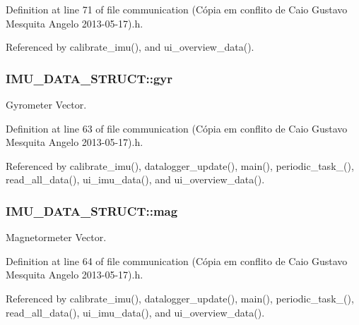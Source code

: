 Definition at line 71 of file communication (\-Cópia em conflito de Caio Gustavo Mesquita Angelo 2013-\/05-\/17).\-h.



Referenced by calibrate\-\_\-imu(), and ui\-\_\-overview\-\_\-data().

\hypertarget{structIMU__DATA__STRUCT_a0c1ac26626e4434a2ee124a1928a23a1}{
\subsubsection[{gyr}]{ I\-M\-U\-\_\-\-D\-A\-T\-A\-\_\-\-S\-T\-R\-U\-C\-T\-::gyr}}\label{structIMU__DATA__STRUCT_a0c1ac26626e4434a2ee124a1928a23a1}


Gyrometer Vector. 



Definition at line 63 of file communication (\-Cópia em conflito de Caio Gustavo Mesquita Angelo 2013-\/05-\/17).\-h.



Referenced by calibrate\-\_\-imu(), datalogger\-\_\-update(), main(), periodic\-\_\-task\-\_(), read\-\_\-all\-\_\-data(), ui\-\_\-imu\-\_\-data(), and ui\-\_\-overview\-\_\-data().

\hypertarget{structIMU__DATA__STRUCT_a40c7df8b6d49297aa52873cfd9b60daa}{
\subsubsection[{mag}]{ I\-M\-U\-\_\-\-D\-A\-T\-A\-\_\-\-S\-T\-R\-U\-C\-T\-::mag}}\label{structIMU__DATA__STRUCT_a40c7df8b6d49297aa52873cfd9b60daa}


Magnetormeter Vector. 



Definition at line 64 of file communication (\-Cópia em conflito de Caio Gustavo Mesquita Angelo 2013-\/05-\/17).\-h.



Referenced by calibrate\-\_\-imu(), datalogger\-\_\-update(), main(), periodic\-\_\-task\-\_(), read\-\_\-all\-\_\-data(), ui\-\_\-imu\-\_\-data(), and ui\-\_\-overview\-\_\-data().

